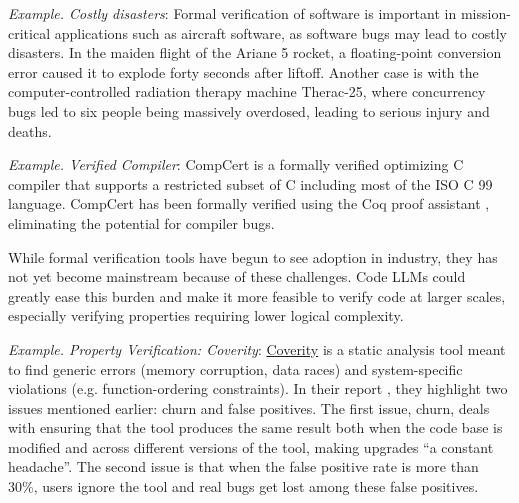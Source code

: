 \begin{tcolorbox}[colback=lightblue, boxrule=0pt, arc=5pt, outer arc=5pt]
\textit{Example. Costly disasters}: Formal verification of software is important in mission-critical applications such as aircraft software, as software bugs may lead to costly disasters. In the maiden flight of the Ariane 5 rocket, a floating-point conversion error caused it to explode forty seconds after liftoff. Another case is with the computer-controlled radiation therapy machine Therac-25, where concurrency bugs led to six people being massively overdosed, leading to serious injury and deaths.
\end{tcolorbox}

\begin{tcolorbox}[colback=lightblue, boxrule=0pt, arc=5pt, outer arc=5pt]
\textit{Example. Verified Compiler}:
CompCert \citep{leroy2016compcert} is a formally verified optimizing C compiler that supports a restricted subset of C including most of the ISO C 99 language. CompCert has been formally verified using the Coq proof assistant \citep{Coq-refman}, eliminating the potential for compiler bugs. 
\end{tcolorbox}


While formal verification tools have begun to see adoption in industry, they has not yet become mainstream because of these challenges. Code LLMs could greatly ease this burden and make it more feasible to verify code at larger scales, especially verifying properties requiring lower logical complexity.

\begin{tcolorbox}[colback=lightblue, boxrule=0pt, arc=5pt, outer arc=5pt]
\textit{Example. Property Verification: Coverity}:
\href{https://scan.coverity.com/}{Coverity} is a static analysis tool meant to find generic errors (memory corruption, data races) and system-specific violations (e.g. function-ordering constraints). In their report \citep{bessey2010few}, they highlight two issues mentioned earlier: churn and false positives. The first issue, churn, deals with ensuring that the tool produces the same result both when the code base is modified and across different versions of the tool, making upgrades ``a constant headache''. The second issue is that when the false positive rate is more than 30\%, users ignore the tool and real bugs get lost among these false positives. 
\end{tcolorbox}